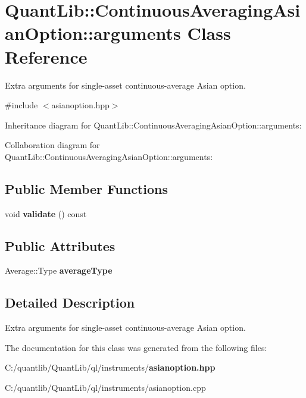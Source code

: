 \section{Quant\+Lib\+:\+:Continuous\+Averaging\+Asian\+Option\+:\+:arguments Class Reference}
\label{class_quant_lib_1_1_continuous_averaging_asian_option_1_1arguments}


Extra arguments for single-\/asset continuous-\/average Asian option.  




{\ttfamily \#include $<$asianoption.\+hpp$>$}



Inheritance diagram for Quant\+Lib\+:\+:Continuous\+Averaging\+Asian\+Option\+:\+:arguments\+:


Collaboration diagram for Quant\+Lib\+:\+:Continuous\+Averaging\+Asian\+Option\+:\+:arguments\+:
\subsection*{Public Member Functions}
\begin{DoxyCompactItemize}
\item 
void {\bfseries validate} () const \label{class_quant_lib_1_1_continuous_averaging_asian_option_1_1arguments_a990400377f6aa09b9b32b858c9fbc7a3}

\end{DoxyCompactItemize}
\subsection*{Public Attributes}
\begin{DoxyCompactItemize}
\item 
Average\+::\+Type {\bfseries average\+Type}\label{class_quant_lib_1_1_continuous_averaging_asian_option_1_1arguments_abd71630e0454c56cb360ffe06d7c76d8}

\end{DoxyCompactItemize}


\subsection{Detailed Description}
Extra arguments for single-\/asset continuous-\/average Asian option. 

The documentation for this class was generated from the following files\+:\begin{DoxyCompactItemize}
\item 
C\+:/quantlib/\+Quant\+Lib/ql/instruments/{\bf asianoption.\+hpp}\item 
C\+:/quantlib/\+Quant\+Lib/ql/instruments/asianoption.\+cpp\end{DoxyCompactItemize}
